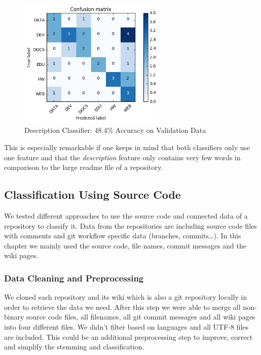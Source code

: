 \documentclass[%
a4paper,
DIV12,
2.5headlines,
bigheadings,
titlepage,
openbib,
]{scrartcl}
\begin{document}
\begin{figure}[H]
	\centering
		\includegraphics[width=7cm]{graphics/confusion-matrix-description-classifier.png}
	\caption{Description Classifier: 48.4\% Accuracy on Validation Data}
	\label{confusion-matrix-description-classifier}
\end{figure}

This is especially remarkable if one keeps in mind that both classifiers only use one feature and that the \textit{description} feature only contains very few words in comparison to the large readme file of a repository.

\subsection{Classification Using Source
Code}\label{classification-using-source-code}

We tested different approaches to use the source code and connected data of a repository to classify it.
Data from the repositories are including source code files with comments and git workflow specific data (branches, commits\ldots{}).
In this chapter we mainly used the source code, file names, commit messages and the wiki pages.

\subsubsection{Data Cleaning and
Preprocessing}\label{data-cleaning-and-preprocessing-2}

We cloned each repository and its wiki which is also a git repository locally in order to retrieve the data we need.
After this step we were able to merge all non-binary source code files, all filenames, all git commit messages and all wiki pages into four different files.
We didn't filter based on languages and all UTF-8 files are included.
This could be an additional preprocessing step to improve, correct and simplify the stemming and classification.
\end{document}
